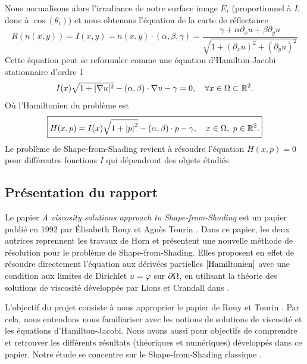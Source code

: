 Nous normalisons alors l'irradiance de notre surface image  $E_i$ (proportionnel à $L$ donc à $\cos (\theta_i)$) et nous obtenons l'équation de la carte de réflectance 
\begin{equation*}
    R(n(x,y))=I(x,y)=n(x,y)\cdot(\alpha,\beta,\gamma)=\dfrac{\gamma+\alpha \partial_xu+\beta \partial_y u}{\sqrt{1+(\partial_xu)^2+(\partial_y u)^2}}
\end{equation*}
Cette équation peut se reformuler comme une équation d'Hamilton-Jacobi stationnaire d'ordre 1
\begin{equation*}
    I(x)\sqrt{1+|\nabla u|^2}-(\alpha,\beta)\cdot \nabla u-\gamma=0,\quad \forall x \in \Omega \subset \mathbb{R}^2.
\end{equation*}
Où l'Hamiltonien du problème est 
\begin{equation}\label{Hamiltonien}
    \boxed{H(x,p)=I(x)\sqrt{1+{\mathopen{}\left|p\right|\mathclose{}}^2}-(\alpha,\beta)\cdot p-\gamma, \quad x\in \Omega, \ p \in \mathbb{R}^2.}
\end{equation}
Le problème de Shape-from-Shading revient à résoudre l'équation $H(x,p)=0$ pour différentes fonctions $I$ qui dépendront des objets étudiés.


\subsection{Présentation du rapport}

Le papier \textit{A viscosity solutions approach to Shape-from-Shading} est un papier publié en 1992 par Élisabeth Rouy et Agnès Tourin \cite{Rouy_et_Turin}. Dans ce papier, les deux autrices reprennent les travaux de Horn et présentent une nouvelle méthode de résolution pour le problème de Shape-from-Shading. Elles proposent en effet de résoudre directement l'équation aux dérivées partielles $\eqref{Hamiltonien}$ avec une condition aux limites de Dirichlet $u=\varphi$ sur $\mathop{}\!{\partial}\Omega$, en utilisant la théorie des solutions de viscosité développée par Lions et Crandall dans \cite{lion}. 

L'objectif du projet consiste à nous approprier le papier de Rouy et Tourin \cite{Rouy_et_Turin}. Par cela, nous entendons nous familiariser avec les notions de solutions de viscosité et les équations d'Hamilton-Jacobi. Nous avons aussi pour objectifs de comprendre et retrouver les différents résultats (théoriques et numériques) développés dans ce papier. Notre étude se concentre sur le Shape-from-Shading \og classique \fg.\\


